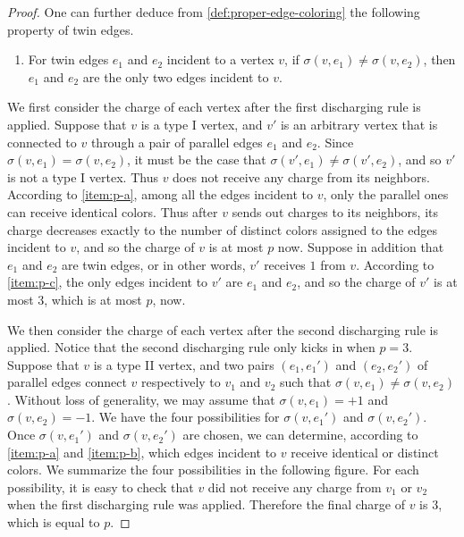 \documentclass[11pt]{article}
\theoremstyle{definition}
\theoremstyle{remark}
\begin{document}
\begin{proof}
    One can further deduce from \cref{def:proper-edge-coloring} the following property of twin edges.
    \begin{enumerate}[label=(\alph*), start=3]
        \item For twin edges $e_1$ and $e_2$ incident to a vertex $v$, if $\sigma(v, e_1) \neq \sigma(v, e_2)$, then $e_1$ and $e_2$ are the only two edges incident to $v$.\label{item:p-c}
    \end{enumerate}
    
    We first consider the charge of each vertex after the first discharging rule is applied. Suppose that $v$ is a type I vertex, and $v'$ is an arbitrary vertex that is connected to $v$ through a pair of parallel edges $e_1$ and $e_2$. Since $\sigma(v, e_1) = \sigma(v, e_2)$, it must be the case that $\sigma(v', e_1) \neq \sigma(v', e_2)$, and so $v'$ is not a type I vertex. Thus $v$ does not receive any charge from its neighbors. According to \ref{item:p-a}, among all the edges incident to $v$, only the parallel ones can receive identical colors. Thus after $v$ sends out charges to its neighbors, its charge decreases exactly to the number of distinct colors assigned to the edges incident to $v$, and so the charge of $v$ is at most $p$ now. Suppose in addition that $e_1$ and $e_2$ are twin edges, or in other words, $v'$ receives $1$ from $v$. According to \ref{item:p-c}, the only edges incident to $v'$ are $e_1$ and $e_2$, and so the charge of $v'$ is at most $3$, which is at most $p$, now.

    We then consider the charge of each vertex after the second discharging rule is applied. Notice that the second discharging rule only kicks in when $p = 3$. Suppose that $v$ is a type II vertex, and two pairs $(e_1, e_1')$ and $(e_2, e_2')$ of parallel edges connect $v$ respectively to $v_1$ and $v_2$ such that $\sigma(v, e_1) \neq \sigma(v, e_2)$. Without loss of generality, we may assume that $\sigma(v, e_1) = +1$ and $\sigma(v, e_2) = -1$. We have the four possibilities for $\sigma(v, e_1')$ and $\sigma(v, e_2')$. Once $\sigma(v, e_1')$ and $\sigma(v, e_2')$ are chosen, we can determine, according to \ref{item:p-a} and \ref{item:p-b}, which edges incident to $v$ receive identical or distinct colors. We summarize the four possibilities in the following figure. For each possibility, it is easy to check that $v$ did not receive any charge from $v_1$ or $v_2$ when the first discharging rule was applied. Therefore the final charge of $v$ is $3$, which is equal to $p$.


\end{proof}
\end{document}
